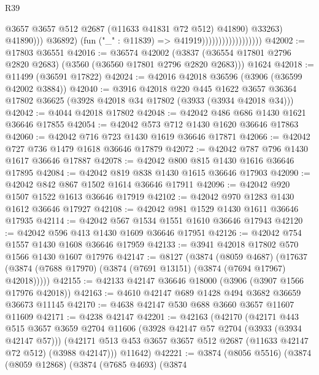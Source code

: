 \begin{lexlean}{R39}
\begin{coremodule}
                                                  @3657
                                                  @3657
                                                  @512
                                                  @2687
                                                  (@11633 @41831 @72 @512)
                                                  @41890)
                                                @33263)
                                              @41890)))
                                        @36892)
                                      (fun ("_" : @11839) => @41919))))))))))))))))))
@42002 := @17803 @36551
@42016 := @36574
    @42002
    (@3837 (@36554 @17801 @2796 @2820 @2683) (@3560 (@36560 @17801 @2796 @2820 @2683)))
    @1624
@42018 := @11499 (@36591 @17822)
@42024 := @42016 @42018 @36596 (@3906 (@36599 @42002 @3884))
@42040 := @3916
    @42018
    @220
    @445
    @1622
    @3657
    @36364
    @17802
    @36625
    (@3928 @42018 @34 @17802 (@3933 (@3934 @42018 @34)))
@42042 := @4044 @42018 @17802
@42048 := @42042 @486 @686 @1430 @1621 @36646 @17855
@42054 := @42042 @573 @712 @1430 @1620 @36646 @17863
@42060 := @42042 @716 @723 @1430 @1619 @36646 @17871
@42066 := @42042 @727 @736 @1479 @1618 @36646 @17879
@42072 := @42042 @787 @796 @1430 @1617 @36646 @17887
@42078 := @42042 @800 @815 @1430 @1616 @36646 @17895
@42084 := @42042 @819 @838 @1430 @1615 @36646 @17903
@42090 := @42042 @842 @867 @1502 @1614 @36646 @17911
@42096 := @42042 @920 @1507 @1522 @1613 @36646 @17919
@42102 := @42042 @970 @1283 @1430 @1612 @36646 @17927
@42108 := @42042 @981 @1529 @1430 @1611 @36646 @17935
@42114 := @42042 @567 @1534 @1551 @1610 @36646 @17943
@42120 := @42042 @596 @413 @1430 @1609 @36646 @17951
@42126 := @42042 @754 @1557 @1430 @1608 @36646 @17959
@42133 := @3941 @42018 @17802 @570 @1566 @1430 @1607 @17976
@42147 := @8127
    (@3874
      (@8059 @4687)
      (@17637 (@3874 (@7688 @17970) (@3874 (@7691 @13151) (@3874 (@7694 @17967) @42018)))))
@42155 := @42133 @42147 @36646 @18000 (@3906 (@3907 @1566 @17976 @42018))
@42163 := @4610 @42147 @689 @1428 @494 @3682 @36659 @36673 @11145
@42170 := @4638 @42147 @530 @688 @3660 @3657 @11607 @11609
@42171 := @4238 @42147
@42201 := @42163
    (@42170
      (@42171
        @443
        @515
        @3657
        @3659
        @2704
        @11606
        (@3928 @42147 @57 @2704 (@3933 (@3934 @42147 @57)))
        (@42171 @513 @453 @3657 @3657 @512 @2687 (@11633 @42147 @72 @512) (@3988 @42147)))
      @11642)
@42221 := @3874
    (@8056 @5516)
    (@3874
      (@8059 @12868)
      (@3874
        (@7685 @4693)
        (@3874

\end{coremodule}
\end{lexlean}
